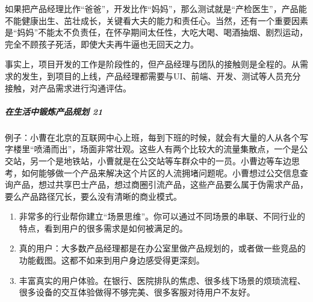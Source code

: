 \documentclass[letterpaper,10pt,english]{sphinxmanual}
\begin{document}
如果把产品经理比作“爸爸”，开发比作“妈妈”，那么测试就是“产检医生”，产品能不能健康出生、茁壮成长，关键看大夫的能力和责任心。当然，还有一个重要因素是“妈妈”不能太不负责任，在怀孕期间太任性，大吃大喝、喝酒抽烟、剧烈运动，完全不顾孩子死活，即使大夫再牛逼也无回天之力。%
\begin{footnote}[188]\sphinxAtStartFootnote
{}
%
\end{footnote}

事实上，项目开发的工作是阶段性的，但产品经理与团队的接触则是全程的。从需求的发生，到项目的上线，产品经理都需要与UI、前端、开发、测试等人员充分接触，对产品需求进行沟通评估。


\subparagraph{在生活中锻炼产品规划 21\sphinxfootnotemark[189]}
\label{\detokenize{chapter_introduction/PM:id32}}%
\begin{footnotetext}[189]\sphinxAtStartFootnote
{}
%
\end{footnotetext}\ignorespaces 
例子：小曹在北京的互联网中心上班，每到下班的时候，就会有大量的人从各个写字楼里“喷涌而出”，场面非常壮观。这些人有两个比较大的流量集散点，一个是公交站，另一个是地铁站，小曹就是在公交站等车群众中的一员。小曹边等车边思考，如何能够做一个产品来解决这个片区的人流拥堵问题呢。小曹想过公交信息查询产品，想过共享巴士产品，想过商圈引流产品，这些产品要么属于伪需求产品，要么产品路径冗长，要么没有清晰的商业模式。
\begin{enumerate}
%
\item {} 
非常多的行业帮你建立“场景思维”。你可以通过不同场景的串联、不同行业的特点，看到用户的很多需求是如何被满足的。

\item {} 
真的用户：大多数产品经理都是在办公室里做产品规划的，或者做一些竞品的功能截图。这都不如来到用户身边感受得更深刻。

\item {} 
丰富真实的用户体验。在银行、医院排队的焦虑、很多线下场景的烦琐流程、很多设备的交互体验做得不够完美、很多客服对待用户不友好。

\end{enumerate}
\end{document}
